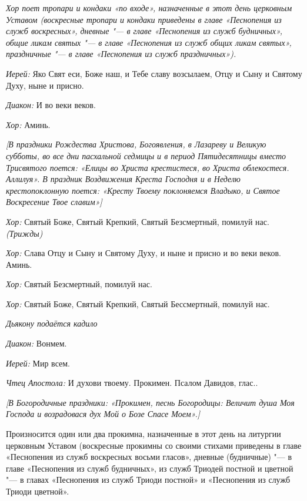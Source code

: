 \begin{mymulticols}

{\itshape Хор поет тропари и кондаки «по входе», назначенные в этот день церковным Уставом (воскресные тропари и кондаки приведены в главе «Песнопения из служб воскресных», дневные "--- в главе «Песнопения из служб будничных», общие ликам святых "--- в главе «Песнопения из служб общих ликам святых», праздничные "--- в главе «Песнопения из служб праздничных»).}

{\itshape Иерей:} Яко Свят еси, Боже наш, и Тебе славу возсылаем, Отцу и Сыну и Святому Духу, ныне и присно.

{\itshape Диакон:} И во веки веков.

{\itshape Хор:} Аминь.


{\itshape [В праздники Рождества Христова, Богоявления, в Лазареву и Великую субботы, во все дни пасхальной седмицы и в период Пятидесятницы вместо Трисвятого поется: «Елицы во Христа крестистеся, во Христа облекостеся. Аллилуя». В праздник Воздвижения Креста Господня и в Неделю крестопоклонную поется: «Кресту Твоему поклоняемся Владыко, и Святое Воскресение Твое славим»]}

{\itshape Хор:} Святый Боже, Святый Крепкий, Святый Безсмертный, помилуй нас. {\itshape (Трижды)}

{\itshape Хор:} Слава Отцу и Сыну и Святому Духу, и ныне и присно и во веки веков. Аминь.

{\itshape Хор:} Святый Безсмертный, помилуй нас.

{\itshape Хор:} Святый Боже, Святый Крепкий, Святый Бессмертный, помилуй нас.


{\itshape Дьякону подаётся кадило}

{\itshape Диакон:} Вонмем.

{\itshape Иерей:} Мир всем.

{\itshape Чтец Апостола:} И духови твоему. Прокимен. Псалом Давидов, глас..

{\itshape [В Богородичные праздники: «Прокимен, песнь Богородицы: Величит душа Моя Господа и возрадовася дух Мой о Бозе Спасе Моем».]

Произносится один или два прокимна, назначенные в этот день на литургии церковным Уставом (воскресные прокимны со своими стихами приведены в главе «Песнопения из служб воскресных восьми гласов», дневные (будничные) "--- в главе «Песнопения из служб будничных», из служб Триодей постной и цветной "--- в главах «Песнопения из служб Триоди постной» и «Песнопения из служб Триоди цветной».

}
\end{mymulticols}
